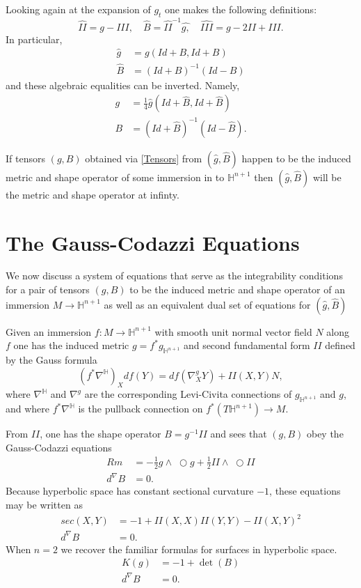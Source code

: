 \documentclass{amsart}
\newcommand{\two}{I\!\!I}
\newcommand{\three}{I\!\!I\!\!I}
\newcommand{\wtimes}{\wedge \!\!\!\!\!\!\!\!\;\bigcirc}
\renewcommand{\H}{\mathbb{H}}
\begin{document}
Looking again at the expansion of $g_t$ one makes the following definitions:
\[
\hat{\two} = g - \three, \quad \hat{B} = \hat{\two}^{-1}\hat{g,} \quad \hat{\three} = g - 2\two + \three.
\]
In particular,
\begin{equation}
\label{TensorsAtInfinity}
\begin{aligned}
\hat{g} &= g(Id+B, Id + B) \\
\hat{B} &= (Id + B)^{-1}(Id-B)
\end{aligned}
\end{equation}
and these algebraic equalities can be inverted. Namely,
\begin{equation}
\label{Tensors}
\begin{aligned} 
g &= \frac{1}{4}\hat{g}(Id + \hat{B}, Id + \hat{B}) \\
B &= (Id + \hat{B})^{-1}(Id - \hat{B}).
\end{aligned}
\end{equation}

If tensors $(g,B)$ obtained via \eqref{Tensors} from $(\hat{g},\hat{B})$ happen to be the induced metric and shape operator of some immersion in to $\H^{n+1}$ then $(\hat{g},\hat{B})$ will be the metric and shape operator at infinty. 


\section{The Gauss-Codazzi Equations}
We now discuss a system of equations that serve as the integrability conditions for a pair of tensors $(g,B)$ to be the induced metric and shape operator of an immersion $M \to \H^{n+1}$ as well as an equivalent dual set of equations for $(\hat{g},\hat{B})$

Given an immersion $f: M \to \H^{n+1}$ with smooth unit normal vector field $N$ along $f$ one has the induced metric $g = f^*g_{\H^{n+1}}$ and second fundamental form $\two$ defined by the Gauss formula
\[
(f^*\nabla^{\H})_Xdf(Y) = df(\nabla^g_XY) + \two(X,Y)N,
\]
where $\nabla^\H$ and $\nabla^g$ are the corresponding Levi-Civita connections of $g_{\H^{n+1}}$ and $g$, and where $f^*\nabla^\H$ is the pullback connection on $f^*(T\H^{n+1}) \to M$.

From $\two$, one has the shape operator $B = g^{-1}\two$ and sees that $(g,B)$ obey the Gauss-Codazzi equations
\begin{equation}
\label{GC} \tag{GC}
\begin{aligned}
Rm &= -\frac{1}{2}g \wtimes g + \frac{1}{2}\two \wtimes \two \\
d^\nabla B &= 0.
\end{aligned}
\end{equation}
Because hyperbolic space has constant sectional curvature $-1$, these equations may be written as
\begin{align*}
sec(X,Y) &= -1 + \two(X,X)\two(Y,Y) - \two(X,Y)^2 \\
d^\nabla B &= 0.
\end{align*}
When $n = 2$ we recover the familiar formulas for surfaces in hyperbolic space. 
\begin{align*}
K(g) &= -1 + \det(B) \\
d^\nabla B &= 0. 
\end{align*}
\end{document}
